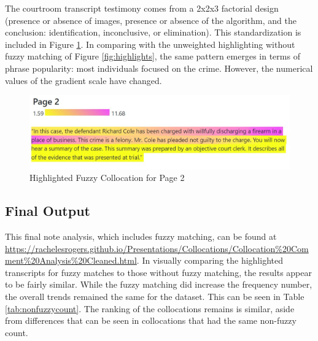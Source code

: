 \documentclass[print]{nuthesis}
\begin{document}
The courtroom transcript testimony comes from a 2x2x3 factorial design (presence or absence of images, presence or absence of the algorithm, and the conclusion: identification, inconclusive, or elimination).
This standardization is included in Figure \ref{fig:weightedhighlights}.
In comparing with the unweighted highlighting without fuzzy matching of Figure \ref{fig:highlights}, the same pattern emerges in terms of phrase popularity: most individuals focused on the crime.
However, the numerical values of the gradient scale have changed.

\begin{figure}

{\centering \includegraphics[width=\linewidth]{images/weightedcollocationanalysis} 

}

\caption{Highlighted Fuzzy Collocation for Page 2}\label{fig:weightedhighlights}
\end{figure}

\hypertarget{final-output}{%
\subsection{Final Output}\label{final-output}}

This final note analysis, which includes fuzzy matching, can be found at \url{https://rachelesrogers.github.io/Presentations/Collocations/Collocation\%20Comment\%20Analysis\%20Cleaned.html}.
In visually comparing the highlighted transcripts for fuzzy matches to those without fuzzy matching, the results appear to be fairly similar.
While the fuzzy matching did increase the frequency number, the overall trends remained the same for the dataset.
This can be seen in Table \ref{tab:nonfuzzycount}.
The ranking of the collocations remains is similar, aside from differences that can be seen in collocations that had the same non-fuzzy count.
\end{document}
